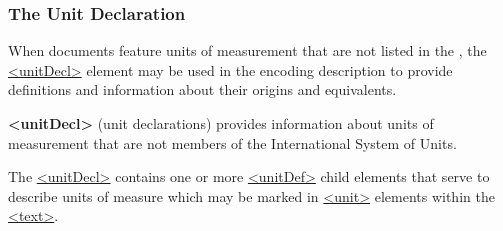 \subsubsection[{The Unit Declaration}]{The Unit Declaration}\label{HDUDECL}\par
When documents feature units of measurement that are not listed in the , the \hyperref[TEI.unitDecl]{<unitDecl>} element may be used in the encoding description to provide definitions and information about their origins and equivalents. 
\begin{sansreflist}
  
\item [\textbf{<unitDecl>}] (unit declarations) provides information about units of measurement that are not members of the International System of Units.
\end{sansreflist}
\par
The \hyperref[TEI.unitDecl]{<unitDecl>} contains one or more \hyperref[TEI.unitDef]{<unitDef>} child elements that serve to describe units of measure which may be marked in \hyperref[TEI.unit]{<unit>} elements within the \hyperref[TEI.text]{<text>}. 
